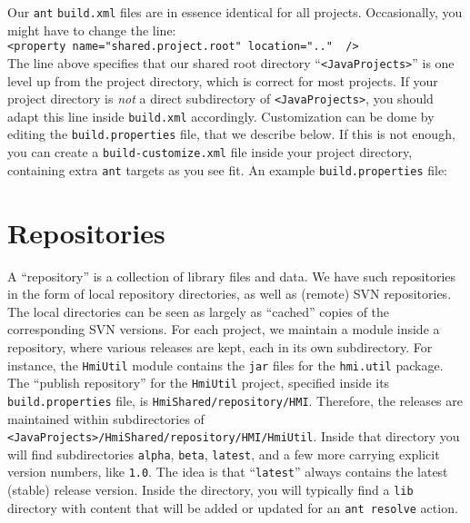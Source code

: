 \noindent
Our \verb"ant" \verb"build.xml" files are in essence identical for all projects.
Occasionally, you might have to change the line:\\
\verb#<property name="shared.project.root" location=".."  />#\\
The line above specifies that our shared root directory ``\verb"<JavaProjects>"'' is one level up
from the project directory, which is correct for most projects.
If your project directory is \emph{not} a direct subdirectory of \verb"<JavaProjects>", you
should adapt this line inside \verb"build.xml" accordingly.
Customization can be dome by editing the \verb"build.properties" file, that we describe below. If this is not enough,
you can create a \verb"build-customize.xml" file inside your project directory,
containing extra \verb"ant" targets as you see fit.
An example \verb"build.properties" file:

\section{Repositories}

A ``repository'' is a collection of library files and data.
We have such repositories in the form of local repository directories, as well as (remote) SVN repositories.
The local directories can be seen as largely as ``cached'' copies of the corresponding SVN versions.
For each project, we maintain a module inside a repository, where various releases are kept, each
in its own subdirectory.
For instance, the \verb"HmiUtil" module contains the \verb"jar" files for the \verb"hmi.util" package.
The ``publish repository'' for the \verb"HmiUtil" project, specified inside its \verb"build.properties" file,
is \verb"HmiShared/repository/HMI".
Therefore, the releases are maintained within subdirectories of
\verb"<JavaProjects>/HmiShared/repository/HMI/HmiUtil".
Inside that directory you will find subdirectories \verb"alpha", \verb"beta", \verb"latest",
and a few more carrying explicit version numbers, like \verb"1.0".
The idea is that ``\verb"latest"'' always contains the latest (stable) release version.
Inside the directory, you will typically find a \verb"lib" directory with content that will be added or
updated for an \verb"ant resolve" action.


